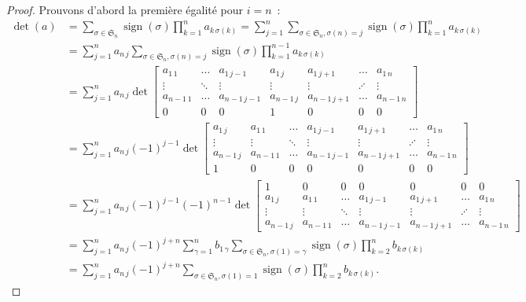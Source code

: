 \documentclass{article}
\DeclareMathOperator{\sign}{sign}
\newcommand{\Perm}{\mathfrak{S}}
\theoremstyle{definition}
\theoremstyle{remark}
\begin{document}
		\begin{proof} Prouvons d'abord la première égalité pour $i=n$~:
		\[\begin{aligned}
			\det(a) &= \sum_{\sigma\in\Perm_n}\sign(\sigma)\prod_{k=1}^na_{k\,\sigma(k)} = \sum_{j=1}^n\sum_{\sigma\in\Perm_n, \sigma(n)=j}\sign(\sigma)\prod_{k=1}^na_{k\,\sigma(k)} \\
			        &= \sum_{j=1}^na_{n\,j}\sum_{\sigma\in\Perm_n, \sigma(n)=j}\sign(\sigma)\prod_{k=1}^{n-1}a_{k\,\sigma(k)} \\
					&= \sum_{j=1}^na_{n\,j}\det
						\begin{bmatrix}
							a_{1\,1}   & \ldots  & a_{1\,j-1}   & a_{1\,j}   & a_{1\,j+1}   & \ldots  & a_{1\,n}   \\
							  \vdots   & \ddots  &   \vdots     &   \vdots   &   \vdots     & \iddots &   \vdots   \\
							a_{n-1\,1} & \ldots  & a_{n-1\,j-1} & a_{n-1\,j} & a_{n-1\,j+1} & \ldots  & a_{n-1\,n} \\
							    0      &     0   &      0       &     1      &     0        &    0    &    0
						\end{bmatrix} \\
					&= \sum_{j=1}^na_{n\,j}(-1)^{j-1}\det
						\begin{bmatrix}
							a_{1\,j}   & a_{1\,1}   & \ldots & a_{1\,j-1}   & a_{1\,j+1}   & \ldots  & a_{1\,n}   \\
							  \vdots   &   \vdots   & \ddots &   \vdots     &   \vdots     & \iddots &   \vdots   \\
							a_{n-1\,j} & a_{n-1\,1} & \ldots & a_{n-1\,j-1} & a_{n-1\,j+1} & \ldots  & a_{n-1\,n} \\
							     1     &     0      &     0  &     0        &      0       &    0    &       0
						\end{bmatrix} \\
					&= \sum_{j=1}^na_{n\,j}(-1)^{j-1}(-1)^{n-1}\det
						\begin{bmatrix}
							     1     &     0      &     0  &     0        &      0       &    0    &       0    \\
							a_{1\,j}   & a_{1\,1}   & \ldots & a_{1\,j-1}   & a_{1\,j+1}   & \ldots  & a_{1\,n}   \\
							  \vdots   &   \vdots   & \ddots &   \vdots     &   \vdots     & \iddots &   \vdots   \\
							a_{n-1\,j} & a_{n-1\,1} & \ldots & a_{n-1\,j-1} & a_{n-1\,j+1} & \ldots  & a_{n-1\,n}
						\end{bmatrix} \\
					&= \sum_{j=1}^na_{n\,j}(-1)^{j+n}\sum_{\gamma=1}^nb_{1\,\gamma}\sum_{\sigma\in\Perm_n, \sigma(1)=\gamma}\sign(\sigma)\prod_{k=2}^nb_{k\,\sigma(k)} \\
					&= \sum_{j=1}^na_{n\,j}(-1)^{j+n}\sum_{\sigma\in\Perm_n, \sigma(1)=1}\sign(\sigma)\prod_{k=2}^nb_{k\,\sigma(k)}.
		\end{aligned}\]


\end{proof}
\end{document}
